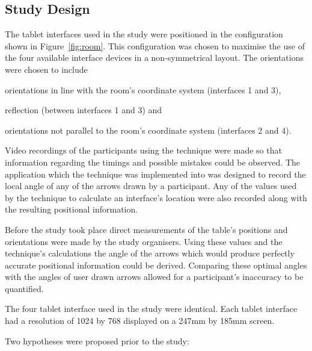 \documentclass{bmcart}
\begin{document}
\subsection*{Study Design}\label{sec:design}

The tablet interfaces used in the study were positioned in the configuration shown in Figure~\ref{fig:room}.
This configuration was chosen to maximise the use of the four available interface devices in a non-symmetrical layout.
The orientations were chosen to include 
\begin{inparaenum}[(i)] 
\item orientations in line with the room's coordinate system (interfaces 1 and 3), 
\item reflection (between interfaces 1 and 3) and 
\item orientations not parallel to the room's coordinate system (interfaces 2 and 4).
\end{inparaenum}

Video recordings of the participants using the technique were made so that information regarding the timings and possible mistakes could be observed.
The application which the technique was implemented into was designed to record the local angle of any of the arrows drawn by a participant.
Any of the values used by the technique to calculate an interface's location were also recorded along with the resulting positional information.

Before the study took place direct measurements of the table's positions and orientations were made by the study organisers.
Using these values and the technique's calculations the angle of the arrows which would produce perfectly accurate positional information could be derived.
Comparing these optimal angles with the angles of user drawn arrows allowed for a participant's inaccuracy to be quantified.

The four tablet interface used in the study were identical.
Each tablet interface had a resolution of 1024 by 768 displayed on a 247mm by 185mm screen.

Two hypotheses were proposed prior to the study:
\end{document}
